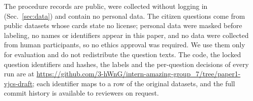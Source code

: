 The procedure records are public, were collected without logging in (Sec.~\ref{sec:data})
and contain no personal data. The citizen questions come from public datasets whose cards state no license; personal data were
masked before labeling, no names or identifiers appear in this paper, and no data were collected from human participants, so no ethics
approval was required. We use them only for evaluation and do not redistribute the question texts. The code, the locked question identifiers and hashes, the labels and the
per-question decisions of every run are at \url{https://github.com/3-hWnG/intern-amazing-group_7/tree/paper1-vjcs-draft}; each identifier maps to a row
of the original datasets, and the full commit history is available to reviewers on request.
